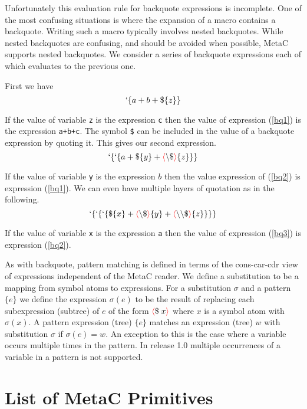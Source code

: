 \documentclass{article}
\newcommand{\fopen}{{\color{red} \langle}}
\newcommand{\fclose}{{\color{red} \rangle}}
\begin{document}
Unfortunately this evaluation rule for backquote expressions is incomplete.  One of the most
confusing situations is where the expansion of a macro contains a backquote.  Writing such a macro typically involves nested backquotes.  While nested backquotes
are confusing, and should be avoided when possible, MetaC supports nested backquotes.  We consider a series of backquote expressions each of which evaluates to the previous one.

First we have
\begin{equation}
\label{bq1}
`\{a+b+\$\{z\}\}
\end{equation}

If the value of variable {\tt z} is the expression {\tt c} then the value of expression (\ref{bq1}) is the expression {\tt a+b+c}.
The symbol {\tt \$} can be included in the value of a backquote expression by quoting it.  This gives our second expression.
\begin{equation}
\label{bq2}
`\{`\{a + \$\{y\} + \fopen \backslash\$\fclose\{z\}\}\}
\end{equation}

If the value of variable {\tt y} is the expression $b$ then the value expression of (\ref{bq2}) is expression (\ref{bq1}).
We can even have multiple layers of quotation as in the following.
\begin{equation}
\label{bq3}
`\{`\{`\{\$\{x\} + \fopen\backslash\$\fclose\{y\} + \fopen\backslash\backslash\$\fclose\{z\}\}\}\}
\end{equation}

If the value of variable {\tt x} is the expression {\tt a} then the value of expression (\ref{bq3}) is expression (\ref{bq2}).

As with backquote, pattern matching is defined in terms of the cons-car-cdr view of expressions independent of the MetaC reader.  We define a substitution to be a mapping from
symbol atoms to expressions. For a substitution $\sigma$ and a pattern $\{e\}$ we define the expression $\sigma(e)$
to be the result of replacing each subexpression (subtree) of $e$ of the form $\fopen \$\;x \fclose$ where $x$ is a symbol atom with $\sigma(x)$.  A pattern expression (tree) $\{e\}$ matches an expression (tree) $w$ with substitution $\sigma$
if $\sigma(e) = w$. An exception to this is the case where a variable occurs multiple times in the pattern.  In release 1.0 multiple occurrences of a variable in a pattern is not supported.

\section{List of MetaC Primitives}
\end{document}
